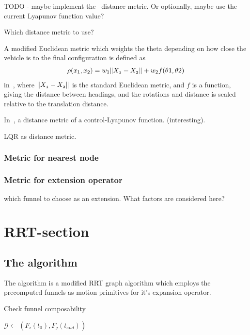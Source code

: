 TODO - maybe implement the~\cite{parkFeedbackMotionPlanning2015} distance
metric. Or optionally, maybe use the current Lyapunov function value?

Which distance metric to use?

A modified Euclidean metric which weights the theta depending on how close the
vehicle is to the final configuration is defined as
\[
  \rho(x_{1},x_{2}) = w_{1}\lVert\mathnormal{X_{1}} - \mathnormal{X_{2}}\rVert +
  w_{2}f(\theta{1},\theta{2})
\]
in~\cite{kuffnerEffectiveSamplingDistance2004}, where \(\lVert\mathnormal{X_{1}}
  - \mathnormal{X_{2}}\rVert\) is the standard Euclidean metric, and \(f\) is a
function, giving the distance between headings, and the rotations and distance
is scaled relative to the translation distance.

In~\cite{parkFeedbackMotionPlanning2015}, a distance metric of a
control-Lyapunov function. (interesting).

\cite{perezLQRRRTOptimalSamplingbased2012a} LQR as distance metric.

\subsubsection{Metric for nearest node}
\subsubsection{Metric for extension operator}

\ie which funnel to choose as an extension. What factors are considered here?


\section{RRT-section}

\subsection{The \rrtfunnel{} algorithm}

The \rrtfunnel{} algorithm is a modified \ac{RRT} graph algorithm which employs
the precomputed funnels as motion primitives for it's expansion operator.

\begin{algorithm}
  \caption{Check funnel composability}
  \label{alg:create-funnel-graph}
  \DontPrintSemicolon \SetAlgoNoLine

   

   {  {
       { \(\mathcal{G} \leftarrow{}
        \left( F_{i}(t_{0}), F_{j}(t_{end}) \right)\) } \; }\; }\;

\end{algorithm}

